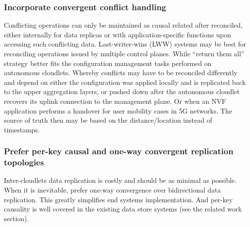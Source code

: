 \documentclass[conference]{IEEEtran}
\begin{document}
\subsubsection{Incorporate convergent conflict handling}
Conflicting operations can only be maintained as causal related after
reconciled, either internally for data replicas or with application-specific
functions upon accessing such conflicting data. Last-writer-wins (LWW)
systems\cite{b1}\cite{b13} may be best for reconciling operations issued by
multiple control planes. While ``return them all''\cite{b17} strategy better
fits the configuration management tasks performed on autonomous cloudlets.
Whereby conflicts may have to be reconciled differently and depend on either
the configuration was applied locally and is replicated back to the upper
aggregation layers, or pushed down after the autonomous cloudlet recovers its
uplink connection to the management plane. Or when an NVF application performs
a handover for user mobility cases in 5G networks. The source of truth then may
be based on the distance/location instead of timestamps.

\subsubsection{Prefer per-key causal and one-way convergent replication topologies}
Inter-cloudlets data replication is costly and should be as minimal as possible.
When it is inevitable, prefer one-way convergence\cite{b2} over bidirectional
data replication. This greatly simplifies end systems implementation. And
per-key causality is well covered in the existing data store systems (see the
related work section).
\end{document}
